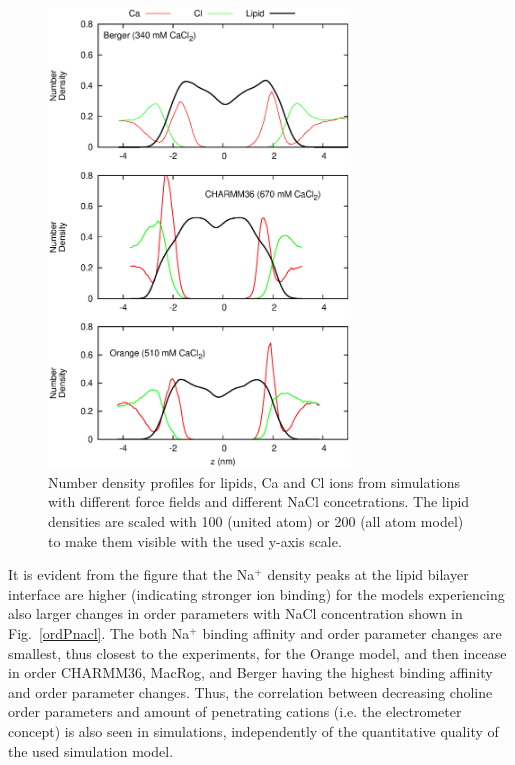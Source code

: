 \documentclass[pre,aps,floatfix,authordate1-4,twocolumn]{revtex4-1}
\begin{document}
\begin{figure}[]
  \centering
  \includegraphics[width=8cm]{../Fig/CAdensities.eps}
  \caption{\label{IONdensCOMP}
    Number density profiles for lipids, Ca and Cl ions from simulations with different force fields and different NaCl concetrations. 
    The lipid densities are scaled with 100 (united atom) or 200 (all atom model) to make them visible with the used y-axis scale.
  }
\end{figure}
It is evident from the figure that the Na$^+$ density peaks at the lipid bilayer interface are higher (indicating stronger ion binding) for the models
experiencing also larger changes in order parameters with NaCl concentration shown in Fig.~\ref{ordPnacl}. 
The both Na$^+$ binding affinity and order parameter changes are smallest, thus closest to the experiments, for the Orange model, and then incease 
in order CHARMM36, MacRog, and Berger having the highest binding affinity and order parameter changes.
Thus, the correlation between decreasing choline order parameters
and amount of penetrating cations (i.e. the electrometer concept) is also seen in simulations, independently of the quantitative quality of the used simulation model.
\end{document}
